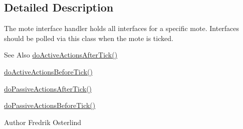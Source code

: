 \subsection{Detailed Description}
The mote interface handler holds all interfaces for a specific mote. Interfaces should be polled via this class when the mote is ticked.

\begin{DoxySeeAlso}{See Also}
\hyperlink{classorg_1_1contikios_1_1cooja_1_1MoteInterfaceHandler_a40a6028e66b1d569b08290a0784aabe4}{do\-Active\-Actions\-After\-Tick()} 

\hyperlink{classorg_1_1contikios_1_1cooja_1_1MoteInterfaceHandler_adb6e3304cc2a03769f61d3c51d84a439}{do\-Active\-Actions\-Before\-Tick()} 

\hyperlink{classorg_1_1contikios_1_1cooja_1_1MoteInterfaceHandler_a665063232706a8ca1fd7d9c1f00861b5}{do\-Passive\-Actions\-After\-Tick()} 

\hyperlink{classorg_1_1contikios_1_1cooja_1_1MoteInterfaceHandler_a13aaf685033814db9359c920e74261f0}{do\-Passive\-Actions\-Before\-Tick()}
\end{DoxySeeAlso}
\begin{DoxyAuthor}{Author}
Fredrik Osterlind 
\end{DoxyAuthor}



